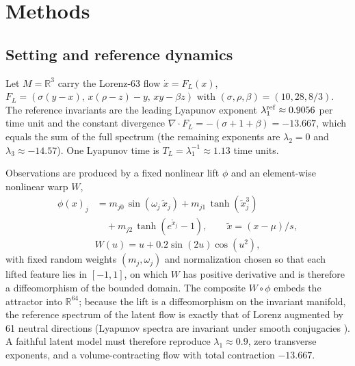 \documentclass[journal]{IEEEtran}
\newcommand{\R}{\mathbb{R}}
\newcommand{\grad}{\nabla}
\begin{document}
\section{Methods}
\label{sec:methods}

\subsection{Setting and reference dynamics}
\label{sec:methods-setup}

Let $M=\R^3$ carry the Lorenz-63 flow
$\dot x=F_L(x)$, $F_L=(\sigma(y-x),\,x(\rho-z)-y,\,xy-\beta z)$ with
$(\sigma,\rho,\beta)=(10,28,8/3)$. The reference invariants are the
leading Lyapunov exponent $\lambda_1^{\rm ref}\approx0.9056$ per time
unit and the constant divergence $\grad\!\cdot F_L=-(\sigma+1+\beta)=
-13.667$, which equals the sum of the full spectrum (the remaining
exponents are $\lambda_2=0$ and $\lambda_3\approx-14.57$). One Lyapunov
time is $T_L=\lambda_1^{-1}\approx1.13$ time units.

Observations are produced by a fixed nonlinear lift $\phi$ and an
element-wise nonlinear warp $W$,
\begin{equation}
\begin{split}
  \phi(x)_j &= m_{j0}\,\sin(\omega_j\,\tilde x_j)+m_{j1}\,\tanh(\tilde x_j^3)\\
            &\quad +m_{j2}\,\tanh(e^{\tilde x_j}-1),\qquad \tilde x=(x-\mu)/s,
\end{split}
\end{equation}
\begin{equation}
  W(u)=u+0.2\sin(2u)\cos(u^2),
\end{equation}
with fixed random weights $(m_j,\omega_j)$ and normalization chosen so
that each lifted feature lies in $[-1,1]$, on which $W$ has positive
derivative and is therefore a diffeomorphism of the bounded domain. The
composite $W\circ\phi$ embeds the attractor into $\R^{64}$; because the
lift is a diffeomorphism on the invariant manifold, the reference
spectrum of the latent flow is exactly that of Lorenz augmented by 61
neutral directions (Lyapunov spectra are invariant under smooth
conjugacies \cite{oseledets1968multiplicative,barreira2002lyapunov}). A
faithful latent model must therefore reproduce $\lambda_1\approx0.9$,
zero transverse exponents, and a volume-contracting flow with total
contraction $-13.667$.
\end{document}
